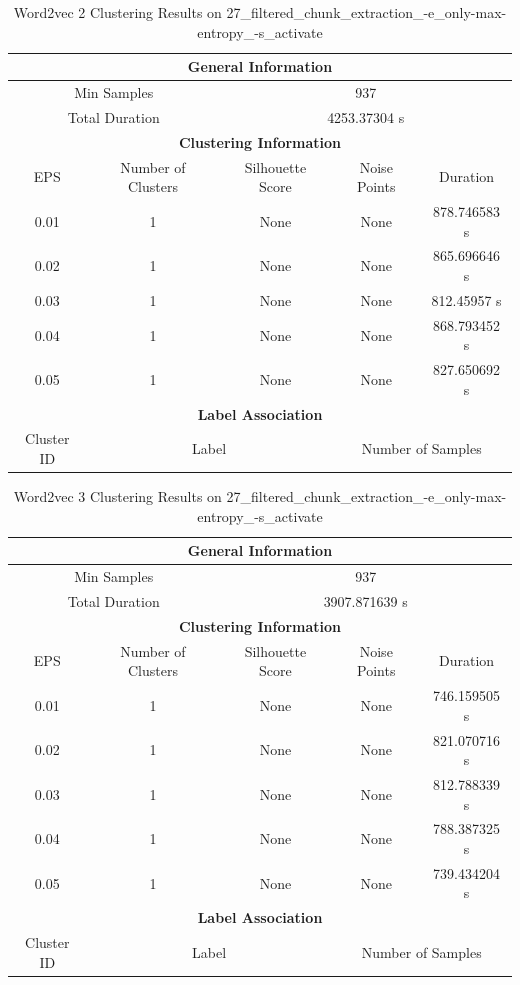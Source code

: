 \begin{longtable}{|c|c|c|c|c|}
\caption{Word2vec 2 Clustering Results on 27\_filtered\_chunk\_extraction\_-e\_only-max-entropy\_-s\_activate} \label{tab:27_filtered_chunk_extraction_-e_only-max-entropy_-s_activate_word2vec_2_clustering_results}\\
\hline
\multicolumn{5}{|c|}{\textbf{General Information}} \\
\hline
\multicolumn{2}{|c|}{Min Samples} & \multicolumn{3}{c|}{937} \\
\multicolumn{2}{|c|}{Total Duration} & \multicolumn{3}{c|}{4253.37304 s} \\
\hline
\multicolumn{5}{|c|}{\textbf{Clustering Information}} \\
\hline
EPS & Number of Clusters & Silhouette Score & Noise Points & Duration \\
0.01 & 1 & None & None & 878.746583 s\\
0.02 & 1 & None & None & 865.696646 s\\
0.03 & 1 & None & None & 812.45957 s\\
0.04 & 1 & None & None & 868.793452 s\\
0.05 & 1 & None & None & 827.650692 s\\
\hline
\multicolumn{5}{|c|}{\textbf{Label Association}} \\
\hline
Cluster ID & \multicolumn{2}{c|}{Label} & \multicolumn{2}{c|}{Number of Samples} \\
\hline
\end{longtable}


\begin{longtable}{|c|c|c|c|c|}
\caption{Word2vec 3 Clustering Results on 27\_filtered\_chunk\_extraction\_-e\_only-max-entropy\_-s\_activate} \label{tab:27_filtered_chunk_extraction_-e_only-max-entropy_-s_activate_word2vec_3_clustering_results}\\
\hline
\multicolumn{5}{|c|}{\textbf{General Information}} \\
\hline
\multicolumn{2}{|c|}{Min Samples} & \multicolumn{3}{c|}{937} \\
\multicolumn{2}{|c|}{Total Duration} & \multicolumn{3}{c|}{3907.871639 s} \\
\hline
\multicolumn{5}{|c|}{\textbf{Clustering Information}} \\
\hline
EPS & Number of Clusters & Silhouette Score & Noise Points & Duration \\
0.01 & 1 & None & None & 746.159505 s\\
0.02 & 1 & None & None & 821.070716 s\\
0.03 & 1 & None & None & 812.788339 s\\
0.04 & 1 & None & None & 788.387325 s\\
0.05 & 1 & None & None & 739.434204 s\\
\hline
\multicolumn{5}{|c|}{\textbf{Label Association}} \\
\hline
Cluster ID & \multicolumn{2}{c|}{Label} & \multicolumn{2}{c|}{Number of Samples} \\
\hline
\end{longtable}


